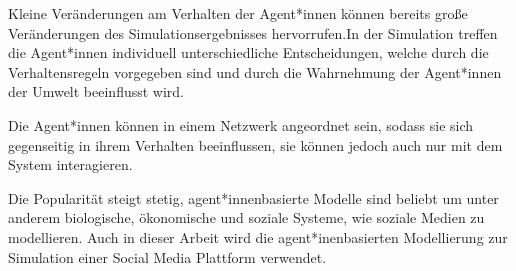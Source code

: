Kleine Veränderungen am Verhalten der Agent*innen können bereits große Veränderungen des Simulationsergebnisses hervorrufen.In der Simulation treffen die Agent*innen individuell unterschiedliche Entscheidungen, welche durch die Verhaltensregeln vorgegeben sind und durch die Wahrnehmung der Agent*innen der Umwelt beeinflusst wird.

Die Agent*innen können in einem Netzwerk angeordnet sein, sodass sie sich gegenseitig in ihrem Verhalten beeinflussen, sie können jedoch auch nur mit dem System interagieren.


Die Popularität steigt stetig, agent*innenbasierte Modelle sind beliebt um unter anderem biologische, ökonomische und soziale Systeme, wie soziale Medien zu modellieren. Auch in dieser Arbeit wird die agent*inenbasierten Modellierung zur Simulation einer Social Media Plattform verwendet.